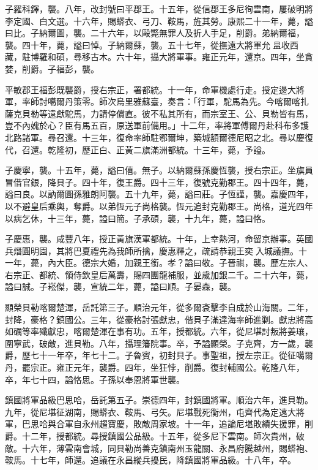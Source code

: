 \begin{pinyinscope}
子羅科鐸，襲。八年，改封號曰平郡王。十五年，從信郡王多尼徇雲南，屢破明將李定國、白文選。十六年，賜蟒衣、弓刀、鞍馬，旌其勞。康熙二十一年，薨，謚曰比。子納爾圖，襲。二十六年，以毆斃無罪人及折人手足，削爵。弟納爾福，襲。四十年，薨，謚曰悼。子納爾蘇，襲。五十七年，從撫遠大將軍允昷收西藏，駐博羅和碩，尋移古木。六十年，攝大將軍事。雍正元年，還京。四年，坐貪婪，削爵。子福彭，襲。

平敏郡王福彭既襲爵，授右宗正，署都統。十一年，命軍機處行走。授定邊大將軍，率師討噶爾丹策零。師次烏里雅蘇臺，奏言：「行軍，駝馬為先。今喀爾喀扎薩克貝勒等遠獻駝馬，力請停償直。彼不私其所有，而宗室王、公、貝勒皆有馬，豈不內媿於心？臣有馬五百，原送軍前備用。」十二年，率將軍傅爾丹赴科布多護北路諸軍。尋召還。十三年，復命率師駐鄂爾坤，築城額爾德尼昭之北。尋以慶復代，召還。乾隆初，歷正白、正黃二旗滿洲都統。十三年，薨，予謚。

子慶寧，襲。十五年，薨，謚曰僖。無子。以納爾蘇孫慶恆襲，授右宗正。坐旗員冒借官銀，降貝子。四十年，復王爵。四十三年，復號克勤郡王。四十四年，薨，謚曰良。以訥爾圖孫雅朗阿襲。五十九年，薨，謚曰莊。子恆謹，襲。嘉慶四年，以不避皇后乘輿，奪爵。以弟恆元子尚格襲。恆元追封克勤郡王。尚格，道光四年以病乞休，十三年，薨，謚曰簡。子承碩，襲，十九年，薨，謚曰恪。

子慶惠，襲。咸豐八年，授正黃旗漢軍都統。十年，上幸熱河，命留京辦事。英國兵熸圓明園，其將巴夏禮先為我師所擒，慶惠釋之，疏請恭親王奕入城議撫。十一年，薨，內大臣。德宗大婚，加親王銜。孝？謚曰敬。子晉祺，襲。歷左宗人、右宗正、都統、領侍欽皇后萬壽，賜四團龍補服，並歲加銀二千。二十六年，薨，謚曰誠。子崧傑，襲，宣統二年，薨，謚曰順。子晏森，襲。

顯榮貝勒喀爾楚渾，岳託第三子。順治元年，從多爾袞擊李自成於山海關。二年，封降，豪格？鎮國公。三年，從豪格討張獻忠，偕貝子滿達海率師進剿。獻忠將高如礪等率殲獻忠，喀爾楚渾在事有功。五年，授都統。六年，從尼堪討叛將姜瓖，圍寧武，破敵，進貝勒。八年，攝理籓院事。卒，予謚顯榮。子克齊，方一歲，襲爵，歷七十一年卒，年七十二。子魯賓，初封貝子。事聖祖，授左宗正。從征噶爾丹，罷宗正。雍正元年，襲爵。四年，坐狂悖，削爵。復封輔國公。乾隆八年，卒，年七十四，謚恪思。子孫以奉恩將軍世襲。

鎮國將軍品級巴思哈，岳託第五子。崇德四年，封鎮國將軍。順治六年，進貝勒。九年，從尼堪征湖南，賜蟒衣、鞍馬、弓矢。尼堪戰死衡州，屯齊代為定遠大將軍，巴思哈與合軍自永州趨寶慶，敗敵周家坡。十一年，追論尼堪敗績失援罪，削爵。十二年，授都統。尋授鎮國公品級。十五年，從多尼下雲南。師次貴州，破敵。十六年，薄雲南會城，同貝勒尚善克鎮南州玉龍關、永昌府騰越州，賜蟒袍、鞍馬。十七年，師還。追議在永昌縱兵擾民，降鎮國將軍品級。十八年，卒。


\end{pinyinscope}
